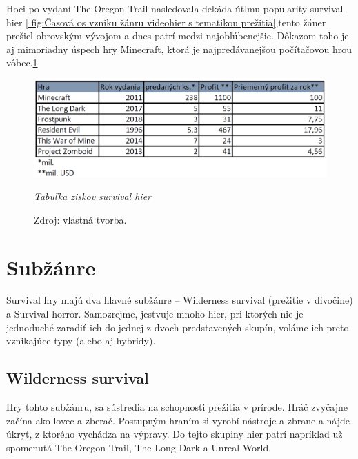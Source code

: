 \documentclass[10pt,oneoside,slovak,a4paper]{article}
\begin{document}
Hoci po vydaní The Oregon Trail nasledovala dekáda útlmu popularity survival hier \ref{ fig:Časová os vzniku žánru videohier s tematikou prežitia},tento žáner prešiel obrovským vývojom a dnes patrí medzi najobľúbenejšie. \cite{IGN}Dôkazom toho je aj mimoriadny úspech hry Minecraft, ktorá je najpredávanejšou počítačovou hrou vôbec.\ref{ fig:Tabuľka ziskov survival hier}

\begin{figure}[h]
	\begin{flushleft}
		
		\includegraphics[width=12.5cm,keepaspectratio]{tabulka.png}
		\caption{\textit{Tabuľka ziskov survival hier}}
		\label{ fig:Tabuľka ziskov survival hier}
  		\caption*{Zdroj: vlastná tvorba.}
		
	\end{flushleft}
\end{figure}







\section{Subžánre} 
Survival hry majú dva hlavné subžánre – Wilderness survival (prežitie v divočine) a Survival  horror.  Samozrejme, jestvuje mnoho hier, pri ktorých nie je jednoduché zaradiť ich do jednej z dvoch predstavených skupín, voláme ich preto vznikajúce typy (alebo aj hybridy).\cite{Reid}

\subsection{Wilderness survival}

Hry tohto subžánru, sa sústredia na schopnosti prežitia v prírode. Hráč zvyčajne začína ako lovec a zberač. Postupným hraním si vyrobí nástroje a zbrane a nájde úkryt, z ktorého vychádza na výpravy. Do tejto skupiny hier patrí napríklad už spomenutá The Oregon Trail, The Long Dark a Unreal World.\cite{Wilds}
\end{document}
